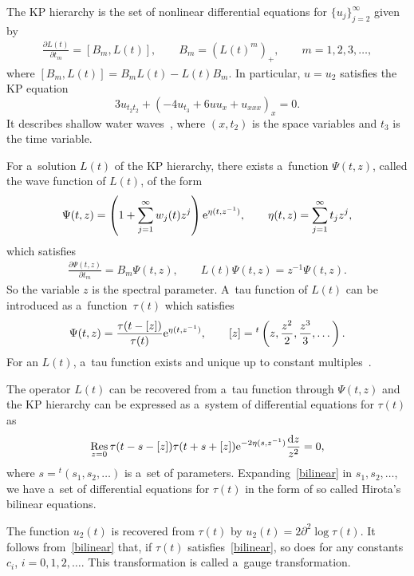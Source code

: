 \documentclass[pdftex]{sigma}
\numberwithin{equation}{section}
\theoremstyle{definition}
\begin{document}
The KP hierarchy is the set of nonlinear differential equations for $\{u_j\}_{j=2}^\infty$
given by
\begin{gather}
\frac{\partial L(t)}{\partial t_m}=\left[B_m,L(t)\right],
\qquad
B_m=\left(L(t)^m\right)_{+},\qquad m=1,2,3,\dots,
\label{KP-hierarchy}
\end{gather}
where $[B_m, L(t)]=B_mL(t)-L(t)B_m$.
In particular, $u=u_2$ satisfies the KP equation
\[%
3u_{t_2t_2}+(-4u_{t_3}+6uu_x+u_{xxx})_x=0.
\]
It describes shallow water waves~\cite{Kodama2017}, where $(x,t_2)$ is the space
variables and $t_3$ is the time variable.

For a~solution $L(t)$ of the KP hierarchy, there exists a~function $\Psi(t,z)$, called
the wave function of $L(t)$,
of the form
\begin{gather*}
\Psi(t,z)=\left(1+\sum_{j=1}^\infty w_j(t) z^j\right){\rm e}^{\eta(t,z^{-1})},
\qquad
\eta(t,z)=\sum_{j=1}^\infty t_j z^{j},
\end{gather*}
which satisfies
\begin{gather}
\frac{\partial \Psi(t,z)}{\partial t_m}=B_m \Psi(t,z),\qquad
L(t)\Psi(t,z)=z^{-1}\Psi(t,z).
\label{linear-eq}
\end{gather}
So the variable $z$ is the spectral parameter.
 A~tau function of $L(t)$ can be introduced as a~function~$\tau(t)$ which satisfies
\begin{gather}
\Psi(t,z)=\frac{\tau(t-[z])}{\tau(t)}{\rm e}^{\eta(t,z^{-1})},
\qquad
[z]={}^t\left(z,\frac{z^2}{2},\frac{z^3}{3},\dots \right).
\label{wave-function}
\end{gather}
For an $L(t)$, a~tau function exists and unique up to constant multiples~\cite{DJKM}.

The operator $L(t)$ can be recovered from a~tau function through $\Psi(t,z)$ and
the KP hierarchy can be expressed as a~system of differential equations for $\tau(t)$ as
\begin{gather}
\mathop{{\rm Res}}_{z=0} \tau(t-s-[z])\tau(t+s+[z]){\rm e}^{-2\eta(s,z^{-1})}\frac{{\rm d}z}{z^2}=0,
\label{bilinear}
\end{gather}
where $s={}^t(s_1,s_2,\dots )$ is a~set of parameters. Expanding~\eqref{bilinear} in $s_1,s_2,\dots $, we have a~set
of differential equations for $\tau(t)$ in the form of so called Hirota's bilinear equations.

The function $u_2(t)$ is recovered from $\tau(t)$ by
$
u_2(t)=2\partial^2\log \tau(t)$.
It follows from~\eqref{bilinear} that, if $\tau(t)$ satisfies~\eqref{bilinear},
so does 
 for any constants $c_i$, $i=0,1,2,\dots $.
This transformation
 is called a~gauge transformation.
\end{document}
